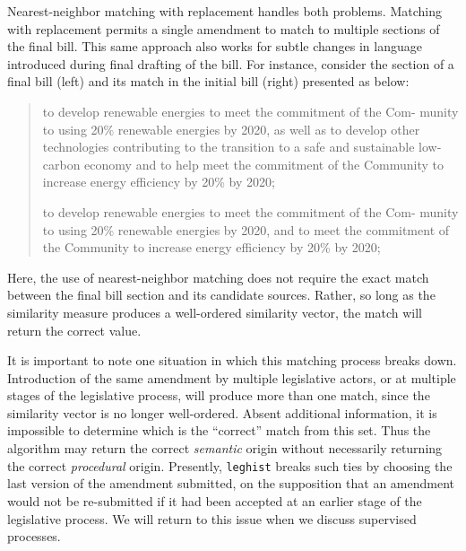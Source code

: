 \documentclass[11pt]{article}
\begin{document}
Nearest-neighbor matching with replacement handles both
problems. Matching with replacement permits a single amendment to
match to multiple sections of the final bill. This same approach also works for subtle changes in language
introduced during final drafting of the bill. For instance, consider
the section of a final bill (left) and its match in the initial bill
(right) presented as below:
\begin{quote}
  \begin{minipage}[t]{0.45\linewidth}
    to develop renewable energies to meet the commitment of the Com-
    munity to using 20\% renewable energies by 2020, as well as to
    develop other technologies contributing to the transition to a
    safe and sustainable low-carbon economy and to help meet the commitment of the Community to increase energy efficiency by 20\% by
    2020;
  \end{minipage}
  \begin{minipage}[h]{0.08\linewidth}
  \end{minipage}
  \begin{minipage}[t]{0.45\linewidth}
    to develop renewable energies to meet the commitment of the Com-
    munity to using 20\% renewable energies by 2020, and to meet the
    commitment of the Community to increase energy efficiency by 20\%
    by 2020;
  \end{minipage}
\end{quote}

Here, the use of nearest-neighbor matching does not require the exact
match between the final bill section and its candidate
sources. Rather, so long as the similarity measure produces a
well-ordered similarity vector, the match will return the correct value.

It is important to note one situation in which this matching process
breaks down. Introduction of the same amendment by multiple
legislative actors, or at multiple stages of the legislative process, will produce more than one match, since the
similarity vector is no longer well-ordered. Absent additional
information, it is impossible to determine which is the ``correct''
match from this set. Thus the algorithm may return the correct
\textit{semantic} origin without necessarily returning the correct
\textit{procedural} origin. Presently, \texttt{leghist} breaks such
ties by choosing the last version of the amendment submitted, on the
supposition that an amendment would not be re-submitted if it had been
accepted at an earlier stage of the legislative process. We will return to this issue when we discuss
supervised processes.
\end{document}

